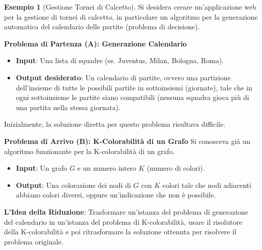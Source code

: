 \documentclass[a4paper]{article}
\theoremstyle{definition} %
\newtheorem{example}[theorem]{Esempio}
\begin{document}
\begin{example}[Gestione Tornei di Calcetto]
Si desidera creare un'applicazione web per la gestione di tornei di calcetto, in particolare un algoritmo per la generazione automatica del calendario delle partite (problema di decisione).

\textbf{Problema di Partenza (A): Generazione Calendario}
\begin{itemize}
    \item \textbf{Input}: Una lista di squadre (es. Juventus, Milan, Bologna, Roma).
    \item \textbf{Output desiderato}: Un calendario di partite, ovvero una partizione dell'insieme di tutte le possibili partite in sottoinsiemi (giornate), tale che in ogni sottoinsieme le partite siano compatibili (nessuna squadra gioca più di una partita nella stessa giornata).
\end{itemize}
Inizialmente, la soluzione diretta per questo problema risultava difficile.

\textbf{Problema di Arrivo (B): K-Colorabilità di un Grafo}
Si conosceva già un algoritmo funzionante per la K-colorabilità di un grafo.
\begin{itemize}
    \item \textbf{Input}: Un grafo $G$ e un numero intero $K$ (numero di colori).
    \item \textbf{Output}: Una colorazione dei nodi di $G$ con $K$ colori tale che nodi adiacenti abbiano colori diversi, oppure un'indicazione che non è possibile.
\end{itemize}

\textbf{L'Idea della Riduzione}: Trasformare un'istanza del problema di generazione del calendario in un'istanza del problema di K-colorabilità, usare il risolutore della K-colorabilità e poi ritrasformare la soluzione ottenuta per risolvere il problema originale.


\end{example}
\end{document}
